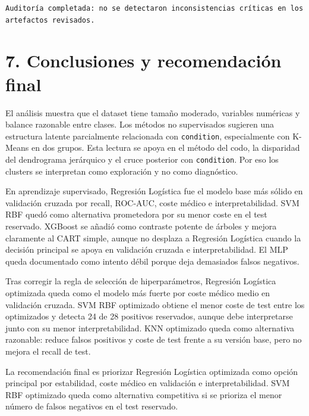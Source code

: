 \documentclass[11pt]{article}
\begin{document}
    
    \begin{Verbatim}[commandchars=\\\{\}]
Auditoría completada: no se detectaron inconsistencias críticas en los
artefactos revisados.
    \end{Verbatim}

    \section{7. Conclusiones y recomendación
final}\label{conclusiones-y-recomendaciuxf3n-final}

El análisis muestra que el dataset tiene tamaño moderado, variables
numéricas y balance razonable entre clases. Los métodos no supervisados
sugieren una estructura latente parcialmente relacionada con
\texttt{condition}, especialmente con K-Means en dos grupos. Esta
lectura se apoya en el método del codo, la disparidad del dendrograma
jerárquico y el cruce posterior con \texttt{condition}. Por eso los
clusters se interpretan como exploración y no como diagnóstico.

En aprendizaje supervisado, Regresión Logística fue el modelo base más
sólido en validación cruzada por recall, ROC-AUC, coste médico e
interpretabilidad. SVM RBF quedó como alternativa prometedora por su
menor coste en el test reservado. XGBoost se añadió como contraste
potente de árboles y mejora claramente al CART simple, aunque no
desplaza a Regresión Logística cuando la decisión principal se apoya en
validación cruzada e interpretabilidad. El MLP queda documentado como
intento débil porque deja demasiados falsos negativos.

Tras corregir la regla de selección de hiperparámetros, Regresión
Logística optimizada queda como el modelo más fuerte por coste médico
medio en validación cruzada. SVM RBF optimizado obtiene el menor coste
de test entre los optimizados y detecta 24 de 28 positivos reservados,
aunque debe interpretarse junto con su menor interpretabilidad. KNN
optimizado queda como alternativa razonable: reduce falsos positivos y
coste de test frente a su versión base, pero no mejora el recall de
test.

La recomendación final es priorizar Regresión Logística optimizada como
opción principal por estabilidad, coste médico en validación e
interpretabilidad. SVM RBF optimizado queda como alternativa competitiva
si se prioriza el menor número de falsos negativos en el test reservado.


    
    
    
\end{document}

